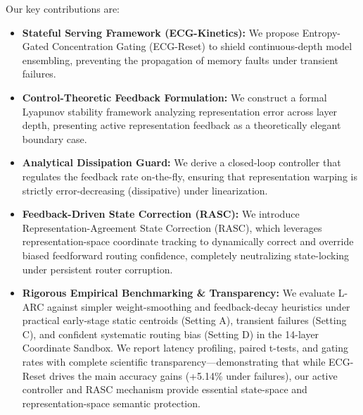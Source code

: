 Our key contributions are:
\begin{itemize}
    \item \textbf{Stateful Serving Framework (ECG-Kinetics):} We propose Entropy-Gated Concentration Gating (ECG-Reset) to shield continuous-depth model ensembling, preventing the propagation of memory faults under transient failures.
    \item \textbf{Control-Theoretic Feedback Formulation:} We construct a formal Lyapunov stability framework analyzing representation error across layer depth, presenting active representation feedback as a theoretically elegant boundary case.
    \item \textbf{Analytical Dissipation Guard:} We derive a closed-loop controller that regulates the feedback rate on-the-fly, ensuring that representation warping is strictly error-decreasing (dissipative) under linearization.
    \item \textbf{Feedback-Driven State Correction (RASC):} We introduce Representation-Agreement State Correction (RASC), which leverages representation-space coordinate tracking to dynamically correct and override biased feedforward routing confidence, completely neutralizing state-locking under persistent router corruption.
    \item \textbf{Rigorous Empirical Benchmarking \& Transparency:} We evaluate L-ARC against simpler weight-smoothing and feedback-decay heuristics under practical early-stage static centroids (Setting A), transient failures (Setting C), and confident systematic routing bias (Setting D) in the 14-layer Coordinate Sandbox. We report latency profiling, paired t-tests, and gating rates with complete scientific transparency---demonstrating that while ECG-Reset drives the main accuracy gains (+5.14\% under failures), our active controller and RASC mechanism provide essential state-space and representation-space semantic protection.
\end{itemize}
